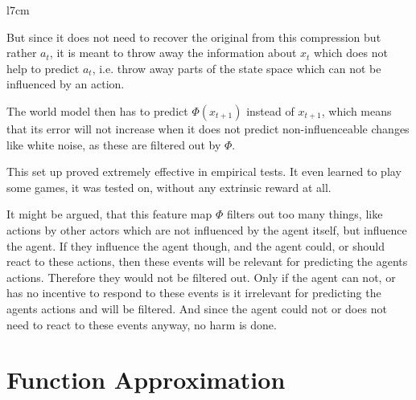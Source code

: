 \begin{wrapfigure}{l}{7cm}
\end{wrapfigure}
But since it does not need to recover the original from this compression but rather \(a_t\), it is meant to throw away the information about \(x_t\) which does not help to predict \(a_t\), i.e. throw away parts of the state space which can not be influenced by an action.

The world model then has to predict \(\Phi(x_{t+1})\) instead of \(x_{t+1}\), which means that its error will not increase when it does not predict non-influenceable changes like white noise, as these are filtered out by \(\Phi\).

This set up proved extremely effective in empirical tests. It even learned to play some games, it was tested on, without any extrinsic reward at all. 

It might be argued, that this feature map \(\Phi\) filters out too many things, like actions by other actors which are not influenced by the agent itself, but influence the agent. If they influence the agent though, and the agent could, or should react to these actions, then these events will be relevant for predicting the agents actions. Therefore they would not be filtered out. Only if the agent can not, or has no incentive to respond to these events is it irrelevant for predicting the agents actions and will be filtered. And since the agent could not or does not need to react to these events anyway, no harm is done. 

\section{Function Approximation}

